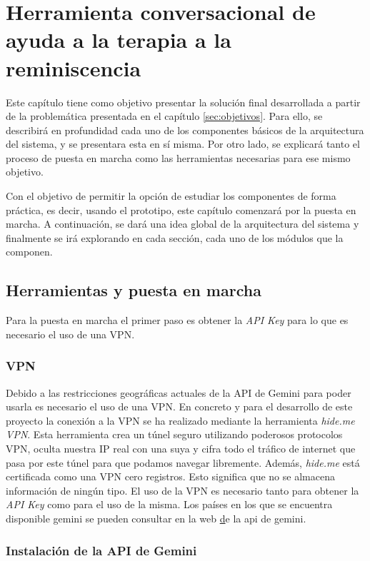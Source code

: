 \chapter{Herramienta conversacional de ayuda a la terapia a la reminiscencia}
\label{cap:ChatBot final}
Este capítulo tiene como objetivo presentar la solución final desarrollada a partir de la problemática presentada en el capítulo \ref{sec:objetivos}. Para ello, se describirá en profundidad cada uno de los componentes básicos de la arquitectura del sistema, y se presentara esta en sí misma. Por otro lado, se explicará tanto el proceso de puesta en marcha como las herramientas necesarias para ese mismo objetivo. 

Con el objetivo de permitir la opción de estudiar los componentes de forma práctica, es decir, usando el prototipo, este capítulo comenzará por la puesta en marcha. A continuación, se dará una idea global de la arquitectura del sistema y finalmente se irá explorando en cada sección, cada uno de los módulos que la componen. 
\section{Herramientas y puesta en marcha}
Para la puesta en marcha el primer paso es obtener la \textit{API Key} para lo que es necesario el uso de una VPN.
\subsection{VPN}
Debido a las restricciones geográficas actuales de la API de Gemini para poder usarla es necesario el uso de una VPN. En concreto y para el desarrollo de este proyecto la conexión a la VPN se ha realizado mediante la herramienta \textit{hide.me VPN}. Esta herramienta crea un túnel seguro utilizando poderosos protocolos VPN, oculta nuestra IP real con una suya y cifra todo el tráfico de internet que pasa por este túnel para que podamos navegar libremente. Además, \textit{hide.me} está certificada como una VPN cero registros. Esto significa que no se almacena información de ningún tipo. El uso de la VPN es necesario tanto para obtener la \textit{API Key} como para el uso de la misma. Los países en los que se encuentra disponible gemini se pueden consultar en la web \href{https://ai.google.dev/gemini-api/docs/available-regions?hl=es-419} de la api de gemini. 

\subsection{Instalación de la API de Gemini}


